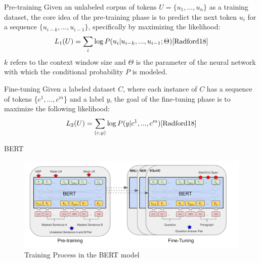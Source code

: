 \documentclass[t]{beamer}
\begin{document}
\begin{frame}{Pre-training}
Given an unlabeled corpus of tokens $U=\{u_1,...,u_n\}$ as a training dataset, the core idea of the pre-training phase is to 
predict the next token $u_i$ for a sequence $\{u_{i-k},...,u_{i-1}\}$, specifically by maximizing the likelihood: 
\begin{equation}
  L_1(U) = \sum_{i}\log{P(u_i|u_{i-k},...,u_{i-1}; \Theta)} \cite{Radford18}
\end{equation}
$k$ refers to the context window size and $\Theta$ is the parameter of the neural network with which the conditional probability $P$ is modeled.
\end{frame}

\begin{frame}{Fine-tuning}
  Given a labeled dataset $C$,
  where each instance of $C$ has a sequence of tokens \{$c^1,...,c^m$\} and a label $y$, the goal of the fine-tuning phase is to maximize the following likelihood:
  \begin{equation}
    L_2(U) = \sum_{(c,y)}\log{P(y|c^1,...,c^m)} \cite{Radford18}
  \end{equation}
\end{frame}

\begin{frame}{BERT}
  \begin{figure}
    \centering
    \includegraphics[width=\textwidth]{BERT Finetuning.png}
    \caption{Training Process in the BERT model \cite{Devlin18}}
    \label{fig:llm2}
\end{figure}
\end{frame}
\end{document}
